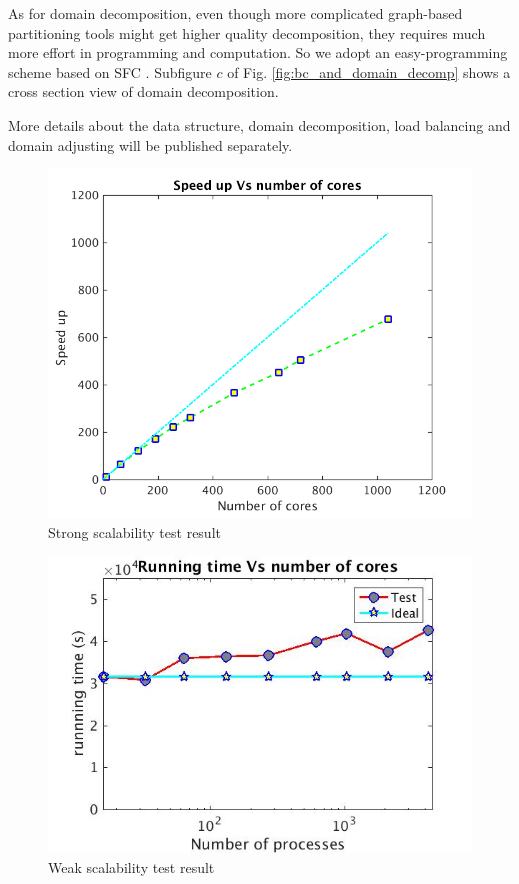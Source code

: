 \documentclass[journal abbreviation, manuscript]{copernicus}
\begin{document}
As for domain decomposition, even though more complicated graph-based partitioning tools \citep {biswas1999experiments} might get higher quality decomposition, they requires much more effort in programming and computation. So we adopt an easy-programming scheme based on SFC \citep {patra1999efficient}. Subfigure $c$ of Fig. \ref{fig:bc_and_domain_decomp} shows a cross section view of domain decomposition.

More details about the data structure, domain decomposition, load balancing and domain adjusting will be published separately.

\begin{figure}[!t]
\centering
\includegraphics[scale=0.35]{strong}
\caption{Strong scalability test result}
\label{fig:strong_scale}
\end{figure}

\begin{figure}[!t]
\centering
\includegraphics[scale=0.35]{weak_scale}
\caption{Weak scalability test result}
\label{fig:weak_scale}
\end{figure}
\end{document}
